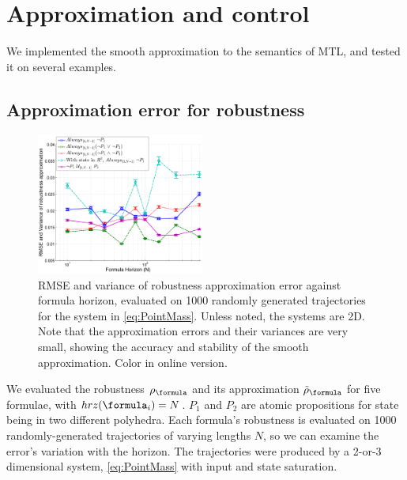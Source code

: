 \section{Approximation and control}
\label{sec:examples}
We implemented the smooth approximation to the semantics of MTL, and tested it on several examples.

\subsection{Approximation error for robustness}
\label{sec: ex apx error}
\begin{figure}[t]
\centering
\includegraphics[width=0.49\textwidth]{figures/RobustnessError_corrected_scissored}
\vspace{-20pt}
\caption{{\small RMSE and variance of robustness approximation error against formula horizon, evaluated on 1000 randomly generated trajectories for the system in \eqref{eq:PointMass}. Unless noted, the systems are 2D. Note that the approximation errors and their variances are very small, showing the accuracy and stability of the smooth approximation. Color in online version.}}
\vspace{-10pt}
\label{fig:sample result}
\end{figure}

We evaluated the robustness $\robf$ and its approximation $\srobf$ for five formulae, with $hrz(\formula_i) = N$. $P_1$ and $P_2$ are atomic propositions for state being in two different polyhedra.
Each formula's robustness is evaluated on 1000 randomly-generated trajectories of varying lengths $N$, so we can  examine the error's variation with the horizon.
The trajectories were produced by a 2-or-3 dimensional system, \eqref{eq:PointMass} with input and state saturation.


